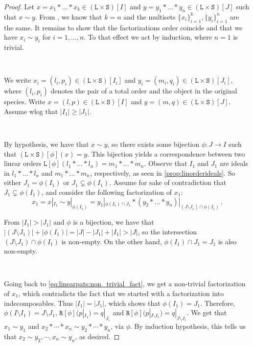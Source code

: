 \documentclass[12pt, reqno]{amsart}
\theoremstyle{definition}
\begin{document}
\begin{proof}
Let $x = x_1 \ast \dots \ast x_k \in (\mathtt{L} \times \mathtt{S})[I]$ and $ y =  y_1 \ast \dots \ast y_n \in (\mathtt{L} \times \mathtt{S})[J]$ such that $x \sim y$.
From \cite[Corollary 3.4.]{Penaguiao2020}, we know that $k = n$ and the multisets $\{x_i\}_{i=1}^k,  \{y_i\}_{i=1}^n$ are the same.
It remains to show that the factorizations order coincide and that we have $x_i \sim y_i$ for $i = 1, \dots , n$.
To that effect we act by induction, where $n = 1$ is trivial.

\

We write $x_i = (l_i, p_i)\in (\mathtt{L}\times \mathtt{S})[I_i]$ and $y_i = (m_i, q_i)\in (\mathtt{L}\times \mathtt{S})[J_i]$, where $(l_i, p_i)$ denotes the pair of a total order and the object in the original species.
Write $x = (l, p) \in (\mathtt{L}\times \mathtt{S})[I] $ and $y = (m, q) \in (\mathtt{L}\times \mathtt{S})[J]$.
Assume wlog that $|I_1 | \geq |J_1|$.

\

By hypothesis, we have that $x \sim y$, so there exists some bijection $\phi: J \to I$ such that $ (\mathtt{L}\times \mathtt{S})[\phi](x) = y$.
This bijection yields a correspondence between two linear orders $\mathtt{L} [\phi] (l_1 \ast \dots \ast l_n) = m_1\ast \dots \ast m_n $.
Observe that $I_1$ and $J_1$ are ideals in $l_1 \ast \dots \ast l_n$ and $m_1 \ast \dots \ast m_n$, respectively, as seen in \cref{prop:linorderideals}.
So either $J_1 = \phi (I_1)$ or $J_1 \subsetneq  \phi(I_1) $.
Assume for sake of contradiction that $J_1 \subsetneq  \phi(I_1)$, and consider the following factorization of $x_1 $:
\begin{equation}\label{eq:linearpats:non_trivial_fact}
x_1 = x|_{I_1} \sim y|_{\phi(I_1)} = y_1|_{\phi(I_1) \cap J_1} \ast (y_2 \ast \dots \ast y_n)|_{(J\setminus J_1) \cap \phi(I_1)}\, . 
\end{equation}

From $|I_1| > |J_1|$ and $\phi $ is a bijection, we have that $| (J\setminus J_1) | + | \phi(I_1) | = |J| - |J_1| + |I_1| > |J|$, so the intersection $(J\setminus J_1) \cap \phi(I_1)$ is non-empty.
On the other hand, $\phi(I_1) \cap J_1 = J_1$ is also non-empty.

\

Going back to \eqref{eq:linearpats:non_trivial_fact}, we get a non-trivial factorization of $x_1$, which contradicts the fact that we started with a factorization into indecomposables. Thus $|I_1 | = |J_1|$, which shows that $\phi(I_1) = J_1$.
Therefore,  $\phi(I\setminus I_1) = J \setminus  J_1$, $ \mathtt{R}[\phi] (p|_{I_1}) = q|_{J_1} $ and $ \mathtt{R}[\phi] (p|_{I \setminus I_1}) = q|_{J \setminus J_1} $.
We get that $x_1 \sim y_1$ and $x_2 \ast \cdots \ast x_n \sim y_2 \ast \cdots \ast y_n$, via $\phi$.
By induction hypothesis, this tells us that $x_2 \sim y_2, \cdots , x_n \sim y_n$, as desired.
\end{proof}
\end{document}
